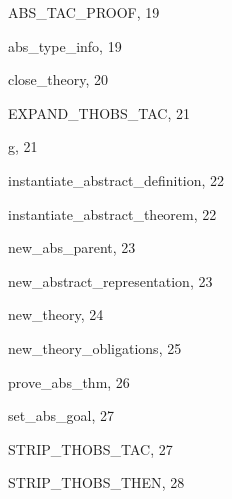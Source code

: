 \begin{theindex}

  \item {\ptt ABS\_TAC\_PROOF}, 19
  \item {\ptt abs\_type\_info}, 19

  \indexspace

  \item {\ptt close\_theory}, 20

  \indexspace

  \item {\ptt EXPAND\_THOBS\_TAC}, 21

  \indexspace

  \item {\ptt g}, 21

  \indexspace

  \item {\ptt instantiate\_abstract\_definition}, 22
  \item {\ptt instantiate\_abstract\_theorem}, 22

  \indexspace

  \item {\ptt new\_abs\_parent}, 23
  \item {\ptt new\_abstract\_representation}, 23
  \item {\ptt new\_theory}, 24
  \item {\ptt new\_theory\_obligations}, 25

  \indexspace

  \item {\ptt prove\_abs\_thm}, 26

  \indexspace

  \item {\ptt set\_abs\_goal}, 27
  \item {\ptt STRIP\_THOBS\_TAC}, 27
  \item {\ptt STRIP\_THOBS\_THEN}, 28

\end{theindex}

